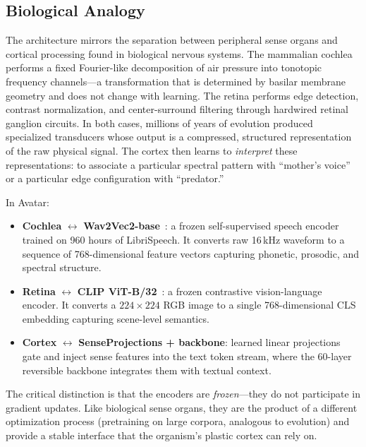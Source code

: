 \subsection{Biological Analogy}
\label{sec:sense_analogy}

The architecture mirrors the separation between peripheral sense organs and cortical processing found in biological nervous systems.
The mammalian cochlea performs a fixed Fourier-like decomposition of air pressure into tonotopic frequency channels---a transformation that is determined by basilar membrane geometry and does not change with learning.
The retina performs edge detection, contrast normalization, and center-surround filtering through hardwired retinal ganglion circuits.
In both cases, millions of years of evolution produced specialized transducers whose output is a compressed, structured representation of the raw physical signal.
The cortex then learns to \emph{interpret} these representations: to associate a particular spectral pattern with ``mother's voice'' or a particular edge configuration with ``predator.''

In Avatar:
\begin{itemize}
    \item \textbf{Cochlea} $\leftrightarrow$ \textbf{Wav2Vec2-base}~\cite{wav2vec2_2020}: a frozen self-supervised speech encoder trained on 960 hours of LibriSpeech.
        It converts raw 16\,kHz waveform to a sequence of 768-dimensional feature vectors capturing phonetic, prosodic, and spectral structure.
    \item \textbf{Retina} $\leftrightarrow$ \textbf{CLIP ViT-B/32}~\cite{clip2021}: a frozen contrastive vision-language encoder.
        It converts a $224 \times 224$ RGB image to a single 768-dimensional CLS embedding capturing scene-level semantics.
    \item \textbf{Cortex} $\leftrightarrow$ \textbf{SenseProjections + backbone}: learned linear projections gate and inject sense features into the text token stream, where the 60-layer reversible backbone integrates them with textual context.
\end{itemize}

The critical distinction is that the encoders are \emph{frozen}---they do not participate in gradient updates.
Like biological sense organs, they are the product of a different optimization process (pretraining on large corpora, analogous to evolution) and provide a stable interface that the organism's plastic cortex can rely on.

